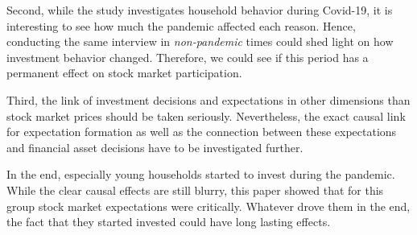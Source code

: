 \documentclass[ProjectABM]{subfiles}
\begin{document}
Second, while the study investigates household behavior during Covid-19, it is interesting to see how much the pandemic affected each reason. Hence, conducting the same interview in \textit{non-pandemic} times could shed light on how investment behavior changed. Therefore, we could see if this period has a permanent effect on stock market participation.

Third, the link of investment decisions and expectations in other dimensions than stock market prices should be taken seriously. Nevertheless, the exact causal link for expectation formation as well as the connection between these expectations and financial asset decisions have to be investigated further.

In the end, especially young households started to invest during the pandemic. While the clear causal effects are still blurry, this paper showed that for this group stock market expectations were critically. Whatever drove them in the end, the fact that they started invested could have long lasting effects.



\onlyinsubfile{}
%
\end{document}

